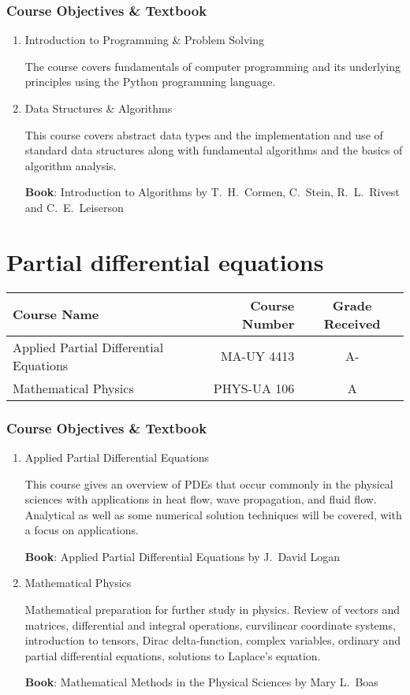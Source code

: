 \documentclass[11pt]{article}
\begin{document}
\subsubsection*{Course Objectives \& Textbook}
\begin{enumerate}
    \item Introduction to Programming \& Problem Solving

    The course covers fundamentals of computer programming and its underlying principles using the Python programming language.
    
    \item Data Structures \& Algorithms
    
    This course covers abstract data types and the implementation and use of standard data structures along with fundamental algorithms and the basics of algorithm analysis.
    
    \textbf{Book}: Introduction to Algorithms by T.\ H.\ Cormen, C.\ Stein, R.\ L.\ Rivest and C.\ E.\ Leiserson

\end{enumerate}

\section*{Partial differential equations}

\begin{center}
\begin{tabular}{lrc}
Course Name & Course Number & Grade Received \\ \toprule
Applied Partial Differential Equations & MA-UY 4413 & A- \\
Mathematical Physics & PHYS-UA 106 & A
\end{tabular}
\end{center}

\subsubsection*{Course Objectives \& Textbook}
\begin{enumerate}
    \item Applied Partial Differential Equations
    
    This course gives an overview of PDEs that occur commonly in the physical sciences with applications in heat flow, wave propagation, and fluid flow. Analytical as well as some numerical solution techniques will be covered, with a focus on applications.
    
    \textbf{Book}: Applied Partial Differential Equations by J.\ David Logan

    \item Mathematical Physics
    
    Mathematical preparation for further study in physics. Review of vectors and matrices, differential and integral operations, curvilinear coordinate systems, introduction to tensors, Dirac delta-function, complex variables, ordinary and partial differential equations, solutions to Laplace's equation.
    
    \textbf{Book}: Mathematical Methods in the Physical Sciences by Mary L.\ Boas
\end{enumerate}
\end{document}

